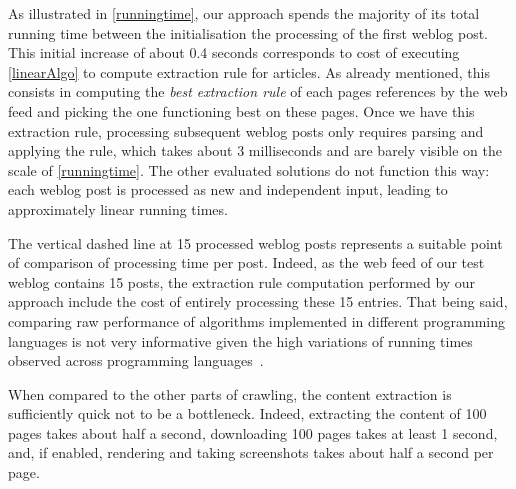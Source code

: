 \begin{figure*}[!hbt]
\centering
\label{runningtime}

\end{figure*}

As illustrated in \autoref{runningtime}, our approach spends the majority 
of its total running time between the initialisation the processing 
of the first weblog post. This initial increase of about 0.4 seconds 
corresponds to cost of executing \autoref{linearAlgo} to compute 
extraction rule for articles. As already mentioned, this consists 
in computing the \emph{best extraction rule} of each pages references 
by the web feed and picking the one functioning best on these pages. 
Once we have this extraction rule, processing subsequent weblog posts only 
requires parsing and applying the rule, which takes about 3 milliseconds 
and are barely visible on the scale of \autoref{runningtime}. The other 
evaluated solutions do not function this way: each weblog post is processed 
as new and independent input, leading to approximately linear running 
times.

The vertical dashed line at 15 processed weblog posts represents a suitable 
point of comparison of processing time per post. Indeed, as the 
web feed of our test weblog contains 15 posts, the extraction rule 
computation performed by our approach include the cost of entirely 
processing these 15 entries. That being said, comparing raw performance 
of algorithms implemented in different programming languages is not very 
informative given the high variations of running times observed across 
programming languages~\cite{hundt2011}.

When compared to the other parts of crawling, the content extraction is sufficiently quick not to be a bottleneck. Indeed, extracting the content of 100 pages takes about half a second, downloading 100 pages takes at least 1 second, and, if enabled, rendering and taking screenshots takes about half a second per page.
